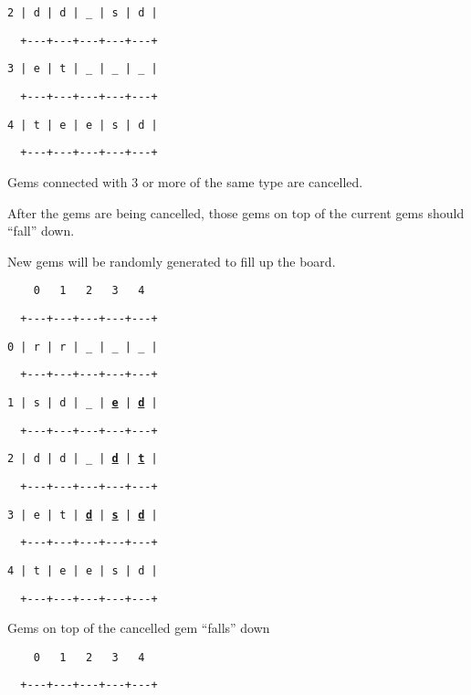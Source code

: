 \begin{itemize}
\begin{minipage}[t]{0.5\columnwidth}
\texttt{2 | d | d | \_ | s | d | }

\texttt{~~+-{}-{}-+-{}-{}-+-{}-{}-+-{}-{}-+-{}-{}-+ }

\texttt{3 | e | t | \_ | \_ | \_ | }

\texttt{~~+-{}-{}-+-{}-{}-+-{}-{}-+-{}-{}-+-{}-{}-+ }

\texttt{4 | t | e | e | s | d | }

\texttt{~~+-{}-{}-+-{}-{}-+-{}-{}-+-{}-{}-+-{}-{}-+}

Gems connected with 3 or more of the same type are cancelled. %
\end{minipage}

After the gems are being cancelled, those gems on top of the current
gems should \textquotedblleft fall\textquotedblright{} down. 

New gems will be randomly generated to fill up the board. 

\noindent %
\begin{minipage}[t]{0.5\columnwidth}%
\texttt{~~~~0~~~1~~~2~~~3~~~4 }

\texttt{~~+-{}-{}-+-{}-{}-+-{}-{}-+-{}-{}-+-{}-{}-+ }

\texttt{0 | r | r | \_ | \_ | \_ | }

\texttt{~~+-{}-{}-+-{}-{}-+-{}-{}-+-{}-{}-+-{}-{}-+ }

\texttt{1 | s | d | \_ | }\texttt{\textbf{\uline{e}}}\texttt{ |
}\texttt{\textbf{\uline{d}}}\texttt{ |}

\texttt{~~+-{}-{}-+-{}-{}-+-{}-{}-+-{}-{}-+-{}-{}-+ }

\texttt{2 | d | d | \_ | }\texttt{\textbf{\uline{d}}}\texttt{ |
}\texttt{\textbf{\uline{t}}}\texttt{ |}

\texttt{~~+-{}-{}-+-{}-{}-+-{}-{}-+-{}-{}-+-{}-{}-+ }

\texttt{3 | e | t | }\texttt{\textbf{\uline{d}}}\texttt{ | }\texttt{\textbf{\uline{s}}}\texttt{
| }\texttt{\textbf{\uline{d}}}\texttt{ |}

\texttt{~~+-{}-{}-+-{}-{}-+-{}-{}-+-{}-{}-+-{}-{}-+ }

\texttt{4 | t | e | e | s | d | }

\texttt{~~+-{}-{}-+-{}-{}-+-{}-{}-+-{}-{}-+-{}-{}-+ }

Gems on top of the cancelled gem \textquotedblleft falls\textquotedblright{}
down%
\end{minipage}%
\begin{minipage}[t]{0.5\columnwidth}%
\texttt{~~~~0~~~1~~~2~~~3~~~4 }

\texttt{~~+-{}-{}-+-{}-{}-+-{}-{}-+-{}-{}-+-{}-{}-+ }


\end{minipage}
\end{itemize}
